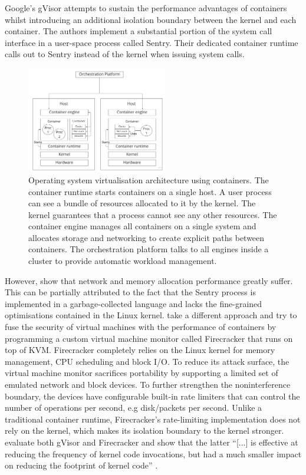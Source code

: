 Google's gVisor \cite{google-gvisor} attempts to sustain the performance advantages of 
containers whilst introducing an additional isolation boundary between the kernel and each container. The authors implement 
a substantial portion of the system call interface in a user-space process called Sentry.
Their dedicated container runtime calls out to Sentry instead of the kernel when issuing system calls.
\begin{figure}[H]
    \centering
    \includegraphics[width=0.55\textwidth]{images/fundamentals/cont-arch.jpg}
    \caption{Operating system virtualisation architecture using containers. The container runtime starts containers on a single host.
    A user process can see a bundle of resources allocated to it by the kernel. The kernel guarantees that a process 
    cannot see any other resources.
    The container engine manages all containers on a single system and allocates storage and networking to create explicit paths between containers.
    The orchestration platform talks to all engines inside a cluster to provide automatic workload management.}
    \label{images:fundamentals/cont-arch.jpg}
\end{figure}
However, \textcite{234857} show that network and memory allocation performance greatly suffer. 
This can be partially attributed to the fact that the Sentry process is implemented in a garbage-collected language 
and lacks the fine-grained optimisations contained in the Linux kernel.
\textcite{246288} take a different approach and try to fuse the security of virtual machines 
with the performance of containers by programming a custom virtual machine monitor 
called Firecracker that runs on top of KVM. Firecracker completely relies on the
Linux kernel for memory management, CPU scheduling and block I/O. To reduce its attack surface,
the virtual machine monitor sacrifices portability by supporting a limited set of emulated 
network and block devices. To further strengthen the noninterference boundary, the devices 
have configurable built-in rate limiters that can control the number of operations per second, e.g
disk/packets per second. Unlike a traditional container runtime, Firecracker's rate-limiting implementation
does not rely on the kernel, which makes its isolation boundary to the kernel stronger. 
\textcite{10.1145/3381052.3381315} evaluate both gVisor and Firecracker and show that 
the latter \enquote{[...] is effective at reducing the frequency of kernel code invocations, but had 
a much smaller impact on reducing the footprint of kernel code} \cite[12]{10.1145/3381052.3381315}. 
\clearpage

